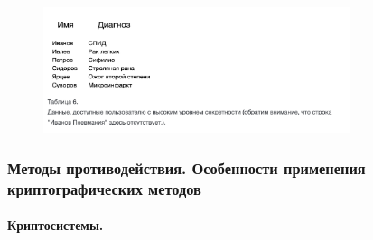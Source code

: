 \begin{figure}[h]
    \centering
    \includegraphics[width=0.8\textwidth]{assets/diagnoses3.png}
\end{figure}


\subsubsection{Методы противодействия. Особенности применения криптографических методов}

\paragraph{Криптосистемы.}

